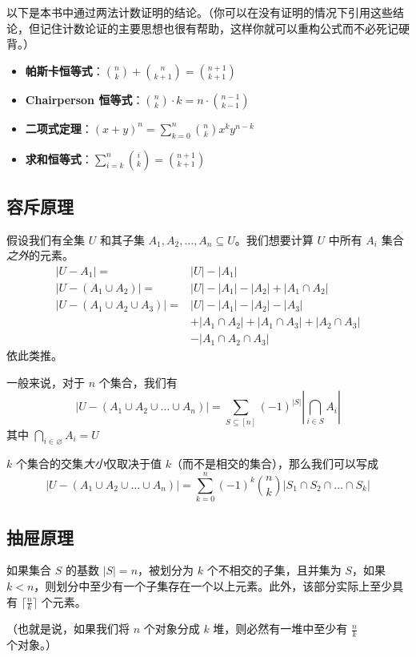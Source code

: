 以下是本书中通过两法计数证明的结论。（你可以在没有证明的情况下引用这些结论，但记住计数论证的主要思想也很有帮助，这样你就可以重构公式而不必死记硬背。）

\begin{itemize}
    \item \textbf{帕斯卡恒等式}：${n \choose k}+{n \choose k+1}={n+1 \choose k+1}$
    \item \textbf{Chairperson 恒等式}：${n \choose k}\cdot k = n \cdot {n-1 \choose k-1}$
    \item \textbf{二项式定理}：$(x+y)^n = \sum_{k=0}^n {n \choose k}x^ky^{n-k}$
    \item \textbf{求和恒等式}：$\sum_{i=k}^n {i \choose k}={n+1 \choose k+1}$
\end{itemize}

\subsection{容斥原理}

假设我们有全集 $U$ 和其子集 $A_1,A_2,\dots, A_n \subseteq U$。我们想要计算 $U$ 中所有 $A_i$ 集合\emph{之外}的元素。
\begin{align*}
    |U-A_1|=                     & |U|-|A_1|                                     \\
    |U-(A_1 \cup A_2) |=         & |U| - |A_1| - |A_2| + |A_1 \cap A_2|          \\
    |U-(A_1 \cup A_2 \cup A_3)|= & |U| - |A_1| - |A_2| - |A_3|                   \\
                                 & +|A_1 \cap A_2|+|A_1 \cap A_3|+|A_2 \cap A_3| \\
                                 & -|A_1 \cap A_2 \cap A_3|
\end{align*}
依此类推。

一般来说，对于 $n$ 个集合，我们有
\[|U-(A_1 \cup A_2 \cup \dots \cup A_n) |= \sum_{S \subseteq [n]}(-1)^{|S|} |\bigcap_{i \in S} A_i|\]
其中 $\bigcap_{i \in \varnothing} A_i = U$

$k$ 个集合的交集\emph{大小}仅取决于值 $k$（而不是相交的集合），那么我们可以写成
\[|U-(A_1 \cup A_2 \cup \dots \cup A_n)|= \sum_{k=0}^n (-1)^k {n \choose k} |S_1 \cap S_2 \cap \dots \cap S_k|\]

\subsection{抽屉原理}

如果集合 $S$ 的基数 $|S|= n$，被划分为 $k$ 个不相交的子集，且并集为 $S$，如果 $k < n$，则划分中至少有一个子集存在一个以上元素。此外，该部分实际上至少具有 $\lceil \frac{n}{k} \rceil$ 个元素。

（也就是说，如果我们将 $n$ 个对象分成 $k$ 堆，则必然有一堆中至少有 $\frac{n}{k}$ 个对象。）
